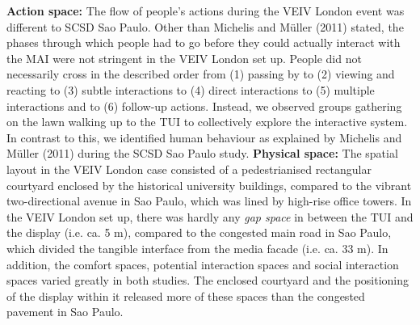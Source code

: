 \textbf{Action space:} The flow of people’s actions during the VEIV London event was different to SCSD Sao Paulo. 
Other than Michelis and Müller (2011) stated, the phases through which people had to go before they could actually interact with the MAI were not stringent in the VEIV London set up. 
People did not necessarily cross in the described order from (1) passing by to (2) viewing and reacting to (3) subtle interactions to (4) direct interactions to (5) multiple interactions and to (6) follow-up actions.
Instead, we observed groups gathering on the lawn walking up to the TUI to collectively explore the interactive system. In contrast to this, we identified human behaviour as explained by Michelis and Müller (2011) during the SCSD Sao Paulo study.
\textbf{Physical space:} The spatial layout in the VEIV London case consisted of a pedestrianised rectangular courtyard enclosed by the historical university buildings, compared to the vibrant two-directional avenue in Sao Paulo, which was lined by high-rise office towers.
In the VEIV London set up, there was hardly any \textit{gap space} in between the TUI and the display (i.e. ca. 5 m), compared to the congested main road in Sao Paulo, which divided the tangible interface from the
media facade (i.e. ca. 33 m). 
In addition, the comfort spaces, potential interaction spaces and social interaction spaces varied greatly in both studies. 
The enclosed courtyard and the positioning of the display within it released more of these spaces than the congested pavement in Sao Paulo.